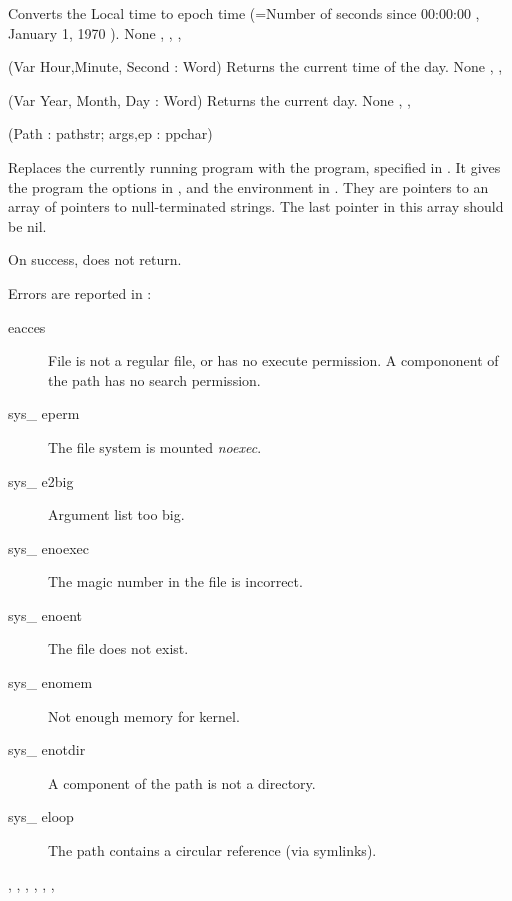 

{
Converts the Local time to epoch time (=Number of seconds since 00:00:00 , January 1,
1970 ).
}
{None}
{, , , }



{ (Var Hour,Minute, Second : Word) }
{
Returns the current time of the day.
}
{None}
{, ,  }



{ (Var Year, Month, Day : Word) }
{
Returns the current day.
}
{None}
{, ,  }



{(Path : pathstr; args,ep : ppchar)}
{
Replaces the currently running program with the program, specified in
.
It gives the program the options in , and the environment in
. They are pointers to an array of pointers to null-terminated
strings. The last pointer in this array should be nil.

On success,  does not return.
}
{Errors are reported in :
\begin{description}
\item[eacces] File is not a regular file, or has no execute permission.
A compononent of the path has no search permission.
\item[sys\_ eperm] The file system is mounted \textit{noexec}.
\item[sys\_ e2big] Argument list too big.
\item[sys\_ enoexec] The magic number in the file is incorrect.
\item[sys\_ enoent] The file does not exist.
\item[sys\_ enomem] Not enough memory for kernel.
\item[sys\_ enotdir] A component of the path is not a directory.
\item[sys\_ eloop] The path contains a circular reference (via symlinks).
\end{description}}
{, ,  ,
, , ,  }



